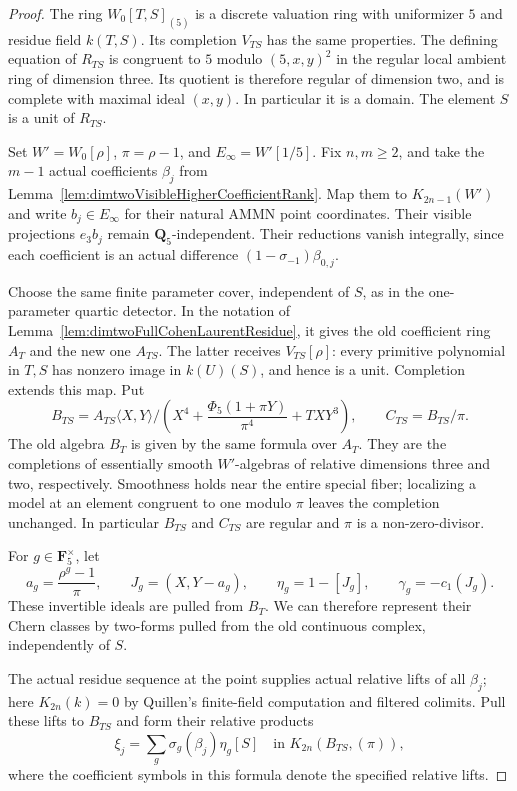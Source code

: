 \documentclass[11pt,a4paper]{article}
\theoremstyle{remark}
\begin{document}
\begin{proof}
The ring $W_0[T,S]_{(5)}$ is a discrete valuation ring with
uniformizer $5$ and residue field $k(T,S)$.  Its completion
$V_{TS}$ has the same properties.  The defining equation of
$R_{TS}$ is congruent to $5$ modulo $(5,x,y)^2$ in the regular
local ambient ring of dimension three.  Its quotient is
therefore regular of dimension two, and is complete with
maximal ideal $(x,y)$.  In particular it is a domain.
The element $S$ is a unit of $R_{TS}$.

Set $W'=W_0[\rho]$, $\pi=\rho-1$, and
$E_\infty=W'[1/5]$.  Fix $n,m\geq2$, and take the $m-1$
actual coefficients $\beta_j$ from
Lemma~\ref{lem:dimtwoVisibleHigherCoefficientRank}.
Map them to $K_{2n-1}(W')$ and write $b_j\in E_\infty$
for their natural AMMN point coordinates.  Their visible
projections $e_3b_j$ remain $\mathbf Q_5$-independent.
Their reductions vanish integrally, since each coefficient
is an actual difference $(1-\sigma_{-1})\beta_{0,j}$.

Choose the same finite parameter cover, independent of $S$,
as in the one-parameter quartic detector.  In the notation of
Lemma~\ref{lem:dimtwoFullCohenLaurentResidue}, it gives the old
coefficient ring $A_T$ and the new one $A_{TS}$.  The latter
receives $V_{TS}[\rho]$: every primitive polynomial in $T,S$
has nonzero image in $k(U)(S)$, and hence is a unit.  Completion
extends this map.  Put
\[
 B_{TS}=A_{TS}\langle X,Y\rangle/
 \left(X^4+\frac{\Phi_5(1+\pi Y)}{\pi^4}+TXY^3\right),
 \qquad C_{TS}=B_{TS}/\pi.
\]
The old algebra $B_T$ is given by the same formula over $A_T$.
They are the completions of essentially smooth $W'$-algebras
of relative dimensions three and two, respectively.
Smoothness holds near the entire special fiber; localizing a
model at an element congruent to one modulo $\pi$ leaves the
completion unchanged.  In particular $B_{TS}$ and $C_{TS}$
are regular and $\pi$ is a non-zero-divisor.

For $g\in\mathbf F_5^\times$, let
\[
 a_g=\frac{\rho^g-1}{\pi},\qquad
 J_g=(X,Y-a_g),\qquad
 \eta_g=1-[J_g],\qquad \gamma_g=-c_1(J_g).
\]
These invertible ideals are pulled from $B_T$.  We can therefore
represent their Chern classes by two-forms pulled from the old
continuous complex, independently of $S$.

The actual residue sequence at the point supplies actual
relative lifts of all $\beta_j$; here
$K_{2n}(k)=0$ by Quillen's finite-field computation and filtered
colimits.  Pull these lifts to $B_{TS}$ and form their relative
products
\[
 \xi_j=\sum_g\sigma_g(\beta_j)\eta_g[S]
       \quad\text{in }K_{2n}(B_{TS},(\pi)),
\]
where the coefficient symbols in this formula denote the
specified relative lifts.


\end{proof}
\end{document}
